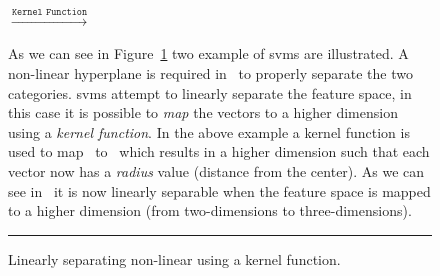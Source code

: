 \begin{figure}[ht]
  \centering
  $\xrightarrow{\texttt{Kernel Function}}$
  \caption{Linearly separating non-linear using a kernel function.}
  \vspace{1mm}
  \footnotesize{As we can see in Figure~\ref{fig:SVM_non-linear_kernel} two example of \gls{svm}s are illustrated. A non-linear hyperplane is required in~ to properly separate the two categories. \gls{svm}s attempt to linearly separate the feature space, in this case it is possible to \emph{map} the vectors to a higher dimension using a \emph{kernel function}. In the above example a kernel function is used to map~ to~ which results in a higher dimension such that each vector now has a \emph{radius} value (distance from the center). As we can see in~ it is now linearly separable when the feature space is mapped to a higher dimension (from two-dimensions to three-dimensions).}
  \vspace{2mm}
  \hrule
  \label{fig:SVM_non-linear_kernel}
\end{figure}

